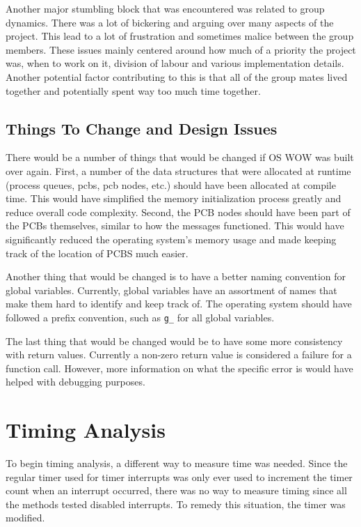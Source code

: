 \documentclass[se]{uw-wkrpt}
\begin{document}
Another major stumbling block that was encountered was related to group dynamics. There was a lot of bickering and arguing over many aspects of the project. This lead to a lot of frustration and sometimes malice between the group members. These issues mainly centered around how much of a priority the project was, when to work on it, division of labour and various implementation details. Another potential factor contributing to this is that all of the group mates lived together and potentially spent way too much time together.

\subsection{Things To Change and Design Issues}

There would be a number of things that would be changed if OS WOW was built over again. First, a number of the data structures that were allocated at runtime (process queues, pcbs, pcb nodes, etc.) should have been allocated at compile time. This would have simplified the memory initialization process greatly and reduce overall code complexity. Second, the PCB nodes should have been part of the PCBs themselves, similar to how the messages functioned. This would have significantly reduced the operating system's memory usage and made keeping track of the location of PCBS much easier.

Another thing that would be changed is to have a better naming convention for global variables. Currently, global variables have an assortment of names that make them hard to identify and keep track of. The operating system should have followed a prefix convention, such as \texttt{g\_} for all global variables.

The last thing that would be changed would be to have some more consistency with return values. Currently a non-zero return value is considered a failure for a function call. However, more information on what the specific error is would have helped with debugging purposes.

\section{Timing Analysis}\label{sec:time}

To begin timing analysis, a different way to measure time was needed. Since the regular timer used for timer interrupts was only ever used to increment the timer count when an interrupt occurred, there was no way to measure timing since all the methods tested disabled interrupts. To remedy this situation, the timer was modified.
\end{document}
